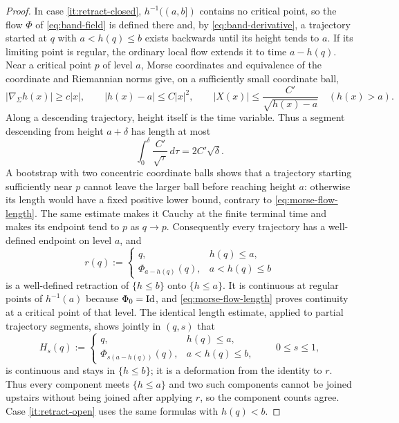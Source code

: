\begin{proof}
In case \ref{it:retract-closed}, $h^{-1}((a,b])$ contains no critical point, so
the flow $\Phi$ of \eqref{eq:band-field} is defined there and, by
\eqref{eq:band-derivative}, a trajectory started at $q$ with
$a<h(q)\le b$ exists backwards until its height tends to $a$.  If its limiting
point is regular, the ordinary local flow extends it to time $a-h(q)$.  Near a
critical point $p$ of level $a$, Morse coordinates and equivalence of the
coordinate and Riemannian norms give, on a sufficiently small coordinate ball,
\begin{equation}\label{eq:morse-flow-bounds}
 |\nabla_\Sigma h(x)|\ge c|x|,
 \qquad |h(x)-a|\le C|x|^2,
 \qquad
 |X(x)|\le \frac{C'}{\sqrt{h(x)-a}}\quad(h(x)>a).
\end{equation}
Along a descending trajectory, height itself is the time variable.  Thus a
segment descending from height $a+\delta$ has length at most
\begin{equation}\label{eq:morse-flow-length}
 \int_0^\delta \frac{C'}{\sqrt{\tau}}\,d\tau=2C'\sqrt\delta.
\end{equation}
A bootstrap with two concentric coordinate balls shows that a trajectory
starting sufficiently near $p$ cannot leave the larger ball before reaching
height $a$: otherwise its length would have a fixed positive lower bound,
contrary to \eqref{eq:morse-flow-length}.  The same estimate makes it Cauchy at
the finite terminal time and makes its endpoint tend to $p$ as $q\to p$.
Consequently every trajectory has a well-defined endpoint on level $a$, and
\begin{equation}\label{eq:retraction}
  r(q):=\begin{cases}q,&h(q)\le a,\\ \Phi_{a-h(q)}(q),&a<h(q)\le b\end{cases}
\end{equation}
is a well-defined retraction of $\{h\le b\}$ onto $\{h\le a\}$.  It is
continuous at regular points of $h^{-1}(a)$ because $\Phi_0=\operatorname{Id}$, and
\eqref{eq:morse-flow-length} proves continuity at a critical point of that
level.  The identical length estimate, applied to partial trajectory segments,
shows jointly in $(q,s)$ that
\[
 H_s(q):=\begin{cases}
 q,&h(q)\le a,\\
 \Phi_{s(a-h(q))}(q),&a<h(q)\le b,
 \end{cases}
 \qquad 0\le s\le1,
\]
is continuous and stays in $\{h\le b\}$; it is a deformation from the
identity to $r$.  Thus every component meets $\{h\le a\}$ and two such
components cannot be joined upstairs without being joined after applying
$r$, so the component counts agree.  Case \ref{it:retract-open} uses the
same formulas with $h(q)<b$.
\end{proof}

